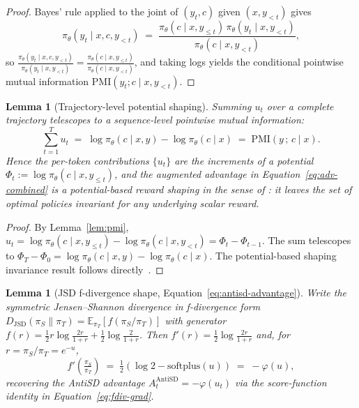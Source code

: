 \documentclass{article}
\newtheorem{lemma}[theorem]{Lemma}
\begin{document}
\begin{proof}
  Bayes' rule applied to the joint of $(y_t, c)$ given $(x, y_{<t})$ gives
  \begin{equation*}
    \pi_\theta(y_t \mid x, c, y_{<t}) \;=\; \frac{\pi_\theta(c \mid x, y_{\le t})\,\pi_\theta(y_t \mid x, y_{<t})}{\pi_\theta(c \mid x, y_{<t})},
  \end{equation*}
  so $\frac{\pi_\theta(y_t \mid x, c, y_{<t})}{\pi_\theta(y_t \mid x, y_{<t})} = \frac{\pi_\theta(c \mid x, y_{\le t})}{\pi_\theta(c \mid x, y_{<t})}$, and taking logs yields the conditional pointwise mutual information $\mathrm{PMI}(y_t; c \mid x, y_{<t})$.
\end{proof}

\begin{lemma}[Trajectory-level potential shaping]
  \label{lem:telescope}
  Summing $u_t$ over a complete trajectory telescopes to a sequence-level pointwise mutual information:
  \begin{equation*}
    \sum_{t=1}^{T} u_t \;=\; \log \pi_\theta(c \mid x, y) - \log \pi_\theta(c \mid x) \;=\; \mathrm{PMI}(y\,;\, c \mid x).
  \end{equation*}
  Hence the per-token contributions $\{u_t\}$ are the increments of a potential $\Phi_t := \log \pi_\theta(c \mid x, y_{\le t})$, and the augmented advantage in Equation~\eqref{eq:adv-combined} is a potential-based reward shaping in the sense of \citet{ng1999policy}: it leaves the set of optimal policies invariant for any underlying scalar reward.
\end{lemma}

\begin{proof}
  By Lemma~\ref{lem:pmi}, $u_t = \log \pi_\theta(c \mid x, y_{\le t}) - \log \pi_\theta(c \mid x, y_{<t}) = \Phi_t - \Phi_{t-1}$. The sum telescopes to $\Phi_T - \Phi_0 = \log \pi_\theta(c \mid x, y) - \log \pi_\theta(c \mid x)$. The potential-based shaping invariance result follows directly~\citep{ng1999policy}.
\end{proof}

\begin{lemma}[JSD f-divergence shape, Equation~\eqref{eq:antisd-advantage}]
  \label{lem:jsd-shape}
  Write the symmetric Jensen--Shannon divergence in f-divergence form $D_{\mathrm{JSD}}(\pi_S \| \pi_T) = \mathbb{E}_{\pi_T}[f(\pi_S / \pi_T)]$ with generator $f(r) = \tfrac12 r \log \frac{2r}{1+r} + \tfrac12 \log \frac{2}{1+r}$. Then $f'(r) = \tfrac{1}{2} \log \frac{2r}{1+r}$ and, for $r = \pi_S/\pi_T = e^{-u}$,
  \begin{equation*}
    f'\!\left(\tfrac{\pi_S}{\pi_T}\right) \;=\; \tfrac{1}{2}\!\left(\log 2 - \mathrm{softplus}(u)\right) \;=\; -\varphi(u),
  \end{equation*}
  recovering the AntiSD advantage $A_t^{\mathrm{AntiSD}} = -\varphi(u_t)$ via the score-function identity in Equation~\eqref{eq:fdiv-grad}.
\end{lemma}
\end{document}
